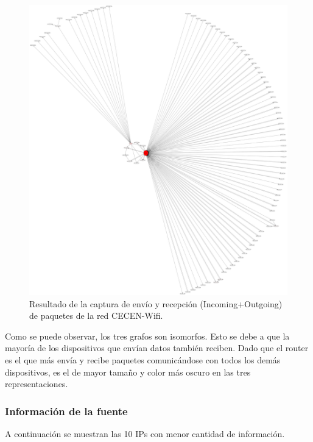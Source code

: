 \documentclass[10pt, a4paper]{article}
\begin{document}
\begin{figure}[H] %
\begin{center}
\includegraphics[width=450pt]{../imgs/cecen-entero.png}
\caption{Resultado de la captura de envío y recepción (Incoming+Outgoing) de paquetes de la red CECEN-Wifi.}
\end{center}
\end{figure}

Como se puede observar, los tres grafos son isomorfos. Esto se debe a que la mayoría de los dispositivos que envían datos también reciben. Dado que el router es el que más envía y recibe paquetes comunicándose con todos los demás dispositivos, es el de mayor tamaño y color más oscuro en las tres representaciones.

\subsubsection{Información de la fuente}

A continuación se muestran las 10 IPs con menor cantidad de información.
\end{document}
